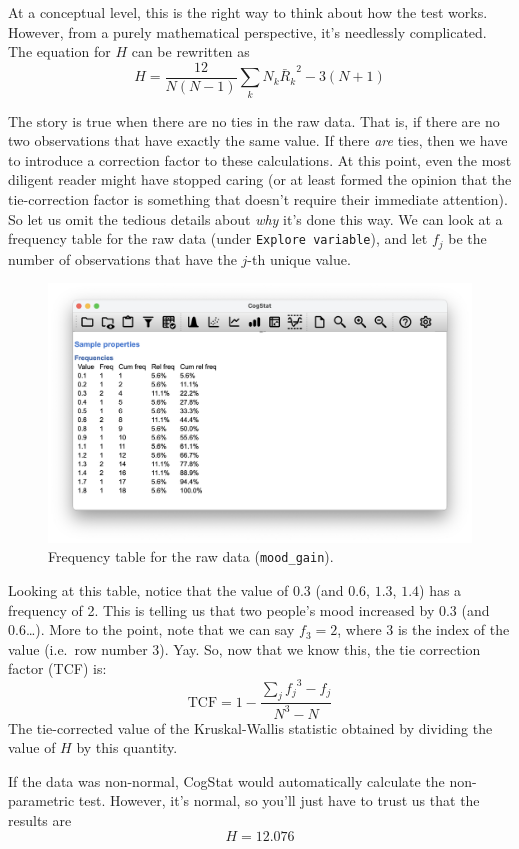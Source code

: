 \documentclass[
  11pt,
  a4paper,
  twoside,symmetric,openright]{book}
\theoremstyle{break}
\theoremstyle{break}
\begin{document}
At a conceptual level, this is the right way to think about how the test works. However, from a purely mathematical perspective, it's needlessly complicated. The equation for \(H\) can be rewritten as
\[
H = \frac{12}{N(N-1)} \sum_k N_k {\bar{R}_k}^2  -  3(N+1)
\]

The story is true when there are no ties in the raw data. That is, if there are no two observations that have exactly the same value. If there \emph{are} ties, then we have to introduce a correction factor to these calculations. At this point, even the most diligent reader might have stopped caring (or at least formed the opinion that the tie-correction factor is something that doesn't require their immediate attention). So let us omit the tedious details about \emph{why} it's done this way. We can look at a frequency table for the raw data (under \texttt{Explore\ variable}), and let \(f_j\) be the number of observations that have the \(j\)-th unique value.



\begin{figure}

{\centering \includegraphics[width=0.6\linewidth]{resources/image/cogstatmoodgainfrequency} 

}

\caption{Frequency table for the raw data (\texttt{mood\_gain}).}\label{fig:moodgainfreq}
\end{figure}

Looking at this table, notice that the value of \(0.3\) (and \(0.6\), \(1.3\), \(1.4\)) has a frequency of 2. This is telling us that two people's mood increased by 0.3 (and 0.6\ldots). More to the point, note that we can say \(f_3 = 2\), where 3 is the index of the value (i.e.~row number 3). Yay. So, now that we know this, the tie correction factor (TCF) is:
\[
\mbox{TCF} = 1 - \frac{\sum_j {f_j}^3 - f_j}{N^3 - N}
\]
The tie-corrected value of the Kruskal-Wallis statistic obtained by dividing the value of \(H\) by this quantity.

If the data was non-normal, CogStat would automatically calculate the non-parametric test. However, it's normal, so you'll just have to trust us that the results are
\[
H = 12.076
\]
\end{document}
